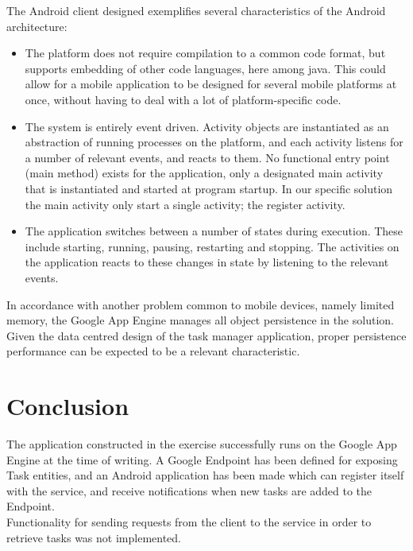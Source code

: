 The Android client designed exemplifies several characteristics of the Android architecture:
\begin{itemize}
	\item The platform does not require compilation to a common code format, but supports embedding of other code languages, here among java. This could allow for a mobile application to be designed for several mobile platforms at once, without having to deal with a lot of platform-specific code.
	\item The system is entirely event driven. Activity objects are instantiated as an abstraction of running processes on the platform, and each activity listens for a number of relevant events, and reacts to them. No functional entry point (main method) exists for the application, only a designated main activity that is instantiated and started at program startup. In our specific solution the main activity only start a single activity; the register activity.
	\item The application switches between a number of states during execution. These include starting, running, pausing, restarting and stopping. The activities on the application reacts to these changes in state by listening to the relevant events.
\end{itemize}

In accordance with another problem common to mobile devices, namely limited memory, the Google App Engine manages all  object persistence in the solution. Given the data centred design of the task manager application, proper persistence performance can be expected to be a relevant characteristic.\\

\section{Conclusion}
The application constructed in the exercise successfully runs on the Google App Engine at the time of writing. A Google Endpoint has been defined for exposing Task entities, and an Android application has been made which can register itself with the service, and receive notifications when new tasks are added to the Endpoint.\\
Functionality for sending requests from the client to the service in order to retrieve tasks was not implemented.
